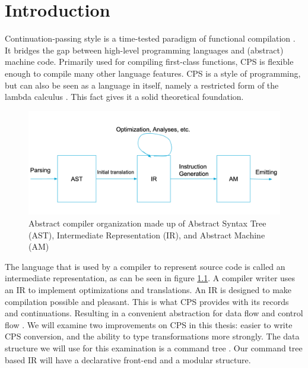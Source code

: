 
\chapter{\label{chap:introduction}Introduction}

Continuation-passing style is a time-tested paradigm of functional compilation \autocite{steele1978rabbit, DBLP:books/daglib/0022396}. It bridges the gap between high-level programming languages and (abstract) machine code. Primarily used for compiling first-class functions, CPS is flexible enough to compile many other language features. CPS is a style of programming, but can also be seen as a language in itself, namely a restricted form of the lambda calculus \autocite{barendregt1984lambda}. This fact gives it a solid theoretical foundation.

\begin{figure}
\includegraphics[width=1\textwidth]{./img/compiler_organisation.png}
\caption{Abstract compiler organization made up of Abstract Syntax Tree (AST), Intermediate Representation (IR), and Abstract Machine (AM)}
\label{fig:comporg}
\end{figure}

The language that is used by a compiler to represent source code is called an intermediate representation, as can be seen in figure \ref{fig:comporg}. A compiler writer uses an IR to implement optimizations and translations. An IR is designed to make compilation possible and pleasant. This is what CPS provides with its records and continuations. Resulting in a convenient abstraction for data flow and control flow \autocite{bruin2020framevm}. We will examine two improvements on CPS in this thesis: easier to write CPS conversion, and the ability to type transformations more strongly. The data structure we will use for this examination is a command tree \autocite{commandtreespoulsen}. Our command tree based IR will have a declarative front-end and a modular structure.

